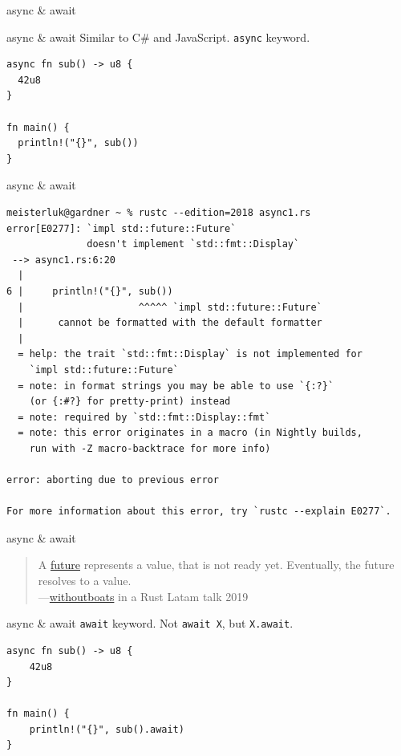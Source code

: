 \documentclass{beamer}
\begin{document}
\begin{frame}[standout]
  async \& await
\end{frame}

\begin{frame}[fragile]{async \& await}
  Similar to C\# and JavaScript.
  \texttt{async} keyword. 

  \begin{verbatim}
async fn sub() -> u8 {
  42u8
}

fn main() {
  println!("{}", sub())
}
  \end{verbatim}
\end{frame}

\begin{frame}[fragile]{async \& await}
  \begin{verbatim}
meisterluk@gardner ~ % rustc --edition=2018 async1.rs
error[E0277]: `impl std::future::Future`
              doesn't implement `std::fmt::Display`
 --> async1.rs:6:20
  |
6 |     println!("{}", sub())
  |                    ^^^^^ `impl std::future::Future`
  |      cannot be formatted with the default formatter
  |
  = help: the trait `std::fmt::Display` is not implemented for
    `impl std::future::Future`
  = note: in format strings you may be able to use `{:?}`
    (or {:#?} for pretty-print) instead
  = note: required by `std::fmt::Display::fmt`
  = note: this error originates in a macro (in Nightly builds,
    run with -Z macro-backtrace for more info)

error: aborting due to previous error

For more information about this error, try `rustc --explain E0277`.
  \end{verbatim}
\end{frame}

\begin{frame}[fragile]{async \& await}
  \begin{quote}
  A \href{https://doc.rust-lang.org/std/future/trait.Future.html}{future} represents a value, that is not ready yet. Eventually, the future resolves to a value. \\
  ---\href{https://www.youtube.com/watch?v=skos4B5x7qE}{withoutboats} in a Rust Latam talk 2019
  \end{quote}
\end{frame}

\begin{frame}[fragile]{async \& await}
  \texttt{await} keyword.
  Not \texttt{await X}, but \texttt{X.await}.

  \begin{verbatim}
async fn sub() -> u8 {
    42u8
}

fn main() {
    println!("{}", sub().await)
}
  \end{verbatim}
\end{frame}
\end{document}

